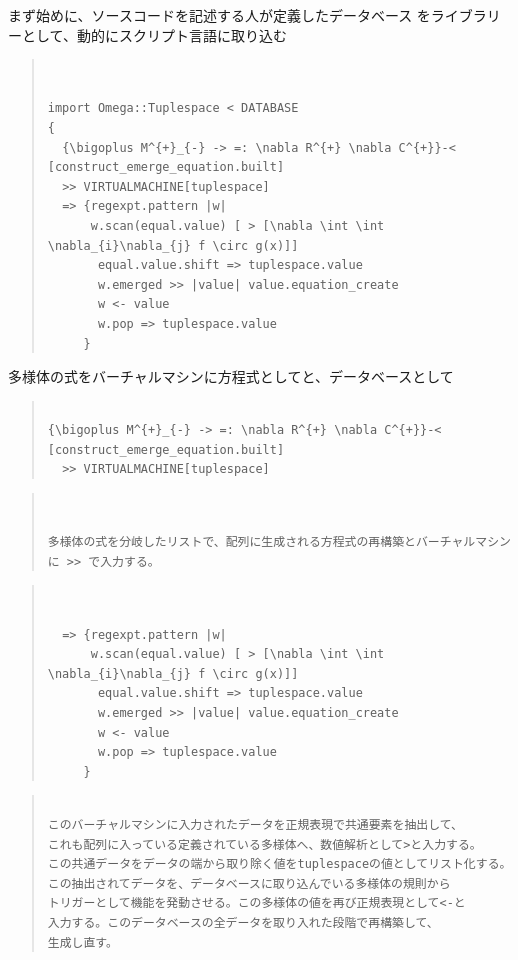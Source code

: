 \documentclass{jsarticle}
\begin{document}
 まず始めに、ソースコードを記述する人が定義したデータベース
 をライブラリーとして、動的にスクリプト言語に取り込む
\begin{quote}
\setlength{\baselineskip}{12pt}
\begin{verbatim}


import Omega::Tuplespace < DATABASE
{
  {\bigoplus M^{+}_{-} -> =: \nabla R^{+} \nabla C^{+}}-< [construct_emerge_equation.built]
  >> VIRTUALMACHINE[tuplespace]
  => {regexpt.pattern |w|
      w.scan(equal.value) [ > [\nabla \int \int \nabla_{i}\nabla_{j} f \circ g(x)]]
       equal.value.shift => tuplespace.value
       w.emerged >> |value| value.equation_create 
       w <- value
       w.pop => tuplespace.value
     }

\end{verbatim}
\end{quote}
多様体の式をバーチャルマシンに方程式としてと、データベースとして
\begin{quote}
\setlength{\baselineskip}{12pt}
\begin{verbatim}

{\bigoplus M^{+}_{-} -> =: \nabla R^{+} \nabla C^{+}}-< [construct_emerge_equation.built]
  >> VIRTUALMACHINE[tuplespace] 

\end{verbatim}
\end{quote}
\begin{quote}
\setlength{\baselineskip}{12pt}
\begin{verbatim}


多様体の式を分岐したリストで、配列に生成される方程式の再構築とバーチャルマシン
に >> で入力する。
\end{verbatim}
\end{quote}
\begin{quote}
\setlength{\baselineskip}{12pt}
\begin{verbatim}


  => {regexpt.pattern |w|
      w.scan(equal.value) [ > [\nabla \int \int \nabla_{i}\nabla_{j} f \circ g(x)]]
       equal.value.shift => tuplespace.value
       w.emerged >> |value| value.equation_create 
       w <- value
       w.pop => tuplespace.value
     }

\end{verbatim}
\end{quote}
\begin{quote}
\setlength{\baselineskip}{12pt}
\begin{verbatim}
 
このバーチャルマシンに入力されたデータを正規表現で共通要素を抽出して、
これも配列に入っている定義されている多様体へ、数値解析として>と入力する。
この共通データをデータの端から取り除く値をtuplespaceの値としてリスト化する。
この抽出されてデータを、データベースに取り込んでいる多様体の規則から
トリガーとして機能を発動させる。この多様体の値を再び正規表現として<-と
入力する。このデータベースの全データを取り入れた段階で再構築して、
生成し直す。
\end{verbatim}
\end{quote}
\end{document}
